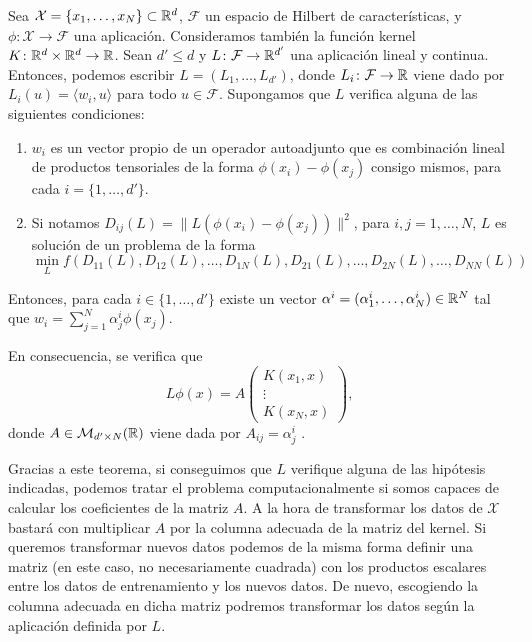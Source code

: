 \begin{thm} \label{thm:representer}
    Sea $\mathcal{X} = \{x_1,\dots,x_N\} \subset \mathbb{R}^d$, $\mathcal{F}$ un espacio de Hilbert de características, y $\phi \colon \mathcal{X} \to \mathcal{F}$ una aplicación. Consideramos también la función kernel $K \colon \mathbb{R}^d \times \mathbb{R}^d \to \mathbb{R}$. Sean $d' \le d$ y $L\colon \mathcal{F} \to \mathbb{R}^{d'}$ una aplicación lineal y continua. Entonces, podemos escribir $L = (L_1, \dots, L_{d'})$, donde $L_i \colon \mathcal{F} \to \mathbb{R}$ viene dado por $L_i(u) = \langle w_i, u \rangle$ para todo $u \in \mathcal{F}$. Supongamos que $L$ verifica alguna de las siguientes condiciones:

    \begin{enumerate}
        \item  $w_i$ es un vector propio de un operador autoadjunto que es combinación lineal de productos tensoriales de la forma $\phi(x_i)-\phi(x_j)$ consigo mismos, para cada $i = \{1,\dots,d'\}$. \label{item:representer:1}
        \item Si notamos $D_{ij}(L) = \|L(\phi(x_i) - \phi(x_j))\|^2$, para $i,j = 1,\dots,N$, $L$ es solución de un problema de la forma
        \begin{equation}
            \min_{L} f(D_{11}(L),D_{12}(L),\dots,D_{1N}(L),D_{21}(L),\dots,D_{2N}(L),\dots,D_{NN}(L))
        \end{equation} \label{item:representer:2}
    \end{enumerate}

    Entonces, para cada $i \in \{1,\dots,d'\}$ existe un vector $\alpha^i = (\alpha_1^i,\dots,\alpha_{N}^i) \in \mathbb{R}^{N}$ tal que $w_i = \sum_{j=1}^N \alpha_j^i \phi(x_j)$.

    En consecuencia, se verifica que 
    \[L\phi(x) = A \begin{pmatrix} K(x_1,x) \\ \vdots \\ K(x_N,x) \end{pmatrix},\]
    donde $A \in \mathcal{M}_{d'\times N}(\mathbb{R})$ viene dada por $A_{ij} = \alpha_j^i$  .
\end{thm}

Gracias a este teorema, si conseguimos que $L$ verifique alguna de las hipótesis indicadas, podemos tratar el problema computacionalmente si somos capaces de calcular los coeficientes de la matriz $A$. A la hora de transformar los datos de $\mathcal{X}$ bastará con multiplicar $A$ por la columna adecuada de la matriz del kernel. Si queremos transformar nuevos datos podemos de la misma forma definir una matriz (en este caso, no necesariamente cuadrada) con los productos escalares entre los datos de entrenamiento y los nuevos datos. De nuevo, escogiendo la columna adecuada en dicha matriz podremos transformar los datos según la aplicación definida por $L$.

